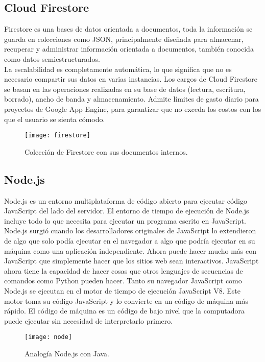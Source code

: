 \subsection{Cloud Firestore}
Firestore es una bases de datos orientada a documentos, toda la información se guarda en colecciones como JSON, principalmente diseñada para almacenar, recuperar y administrar información orientada a documentos, también conocida como datos semiestructurados.\\[0.8cm]
La escalabilidad es completamente automática, lo que significa que no es necesario compartir sus datos en varias instancias. Los cargos de Cloud Firestore se basan en las operaciones realizadas en su base de datos (lectura, escritura, borrado), ancho de banda y almacenamiento. Admite límites de gasto diario para proyectos de Google App Engine, para garantizar que no exceda los costos con los que el usuario se sienta cómodo.
\begin{figure}[H]
  \centering
  \texttt{[image: firestore]}
  \caption{Colección de Firestore con sus documentos internos.}
\end{figure}
\subsection{Node.js}
Node.js es un entorno multiplataforma de código abierto para ejecutar código JavaScript del lado del servidor. El entorno de tiempo de ejecución de Node.js incluye todo lo que necesita para ejecutar un programa escrito en JavaScript. \\[0.8cm]
Node.js surgió cuando los desarrolladores originales de JavaScript lo extendieron de algo que solo podía ejecutar en el navegador a algo que podría ejecutar en su máquina como una aplicación independiente. Ahora puede hacer mucho más con JavaScript que simplemente hacer que los sitios web sean interactivos. JavaScript ahora tiene la capacidad de hacer cosas que otros lenguajes de secuencias de comandos como Python pueden hacer. Tanto su navegador JavaScript como Node.js se ejecutan en el motor de tiempo de ejecución JavaScript V8. Este motor toma su código JavaScript y lo convierte en un código de máquina más rápido. El código de máquina es un código de bajo nivel que la computadora puede ejecutar sin necesidad de interpretarlo primero.
\begin{figure}[H]
  \centering
  \texttt{[image: node]}
  \caption{Analogía Node.js con Java.}
\end{figure}
